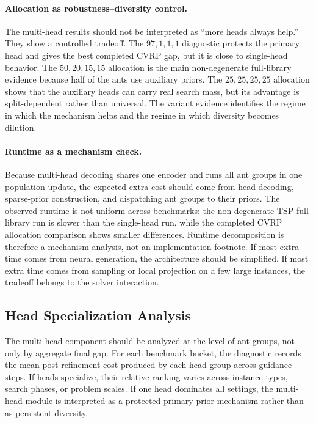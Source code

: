 \documentclass[11pt]{article}
\newcommand{\TSP}{\textsc{TSP}}
\newcommand{\CVRP}{\textsc{CVRP}}
\begin{document}
\paragraph{Allocation as robustness--diversity control.}
The multi-head results should not be interpreted as ``more heads always help.''
They show a controlled tradeoff.
The $97,1,1,1$ diagnostic protects the primary head and gives the best completed \CVRP{} gap, but it is close to single-head behavior.
The $50,20,15,15$ allocation is the main non-degenerate full-library evidence because half of the ants use auxiliary priors.
The $25,25,25,25$ allocation shows that the auxiliary heads can carry real search mass, but its advantage is split-dependent rather than universal.
The variant evidence identifies the regime in which the mechanism helps and the regime in which diversity becomes dilution.

\paragraph{Runtime as a mechanism check.}
Because multi-head decoding shares one encoder and runs all ant groups in one population update, the expected extra cost should come from head decoding, sparse-prior construction, and dispatching ant groups to their priors.
The observed runtime is not uniform across benchmarks: the non-degenerate \TSP{} full-library run is slower than the single-head run, while the completed \CVRP{} allocation comparison shows smaller differences.
Runtime decomposition is therefore a mechanism analysis, not an implementation footnote.
If most extra time comes from neural generation, the architecture should be simplified.
If most extra time comes from sampling or local projection on a few large instances, the tradeoff belongs to the solver interaction.

\subsection{Head Specialization Analysis}
\label{sec:head-specialization}

The multi-head component should be analyzed at the level of ant groups, not only by aggregate final gap.
For each benchmark bucket, the diagnostic records the mean post-refinement cost produced by each head group across guidance steps.
If heads specialize, their relative ranking varies across instance types, search phases, or problem scales.
If one head dominates all settings, the multi-head module is interpreted as a protected-primary-prior mechanism rather than as persistent diversity.
\end{document}
